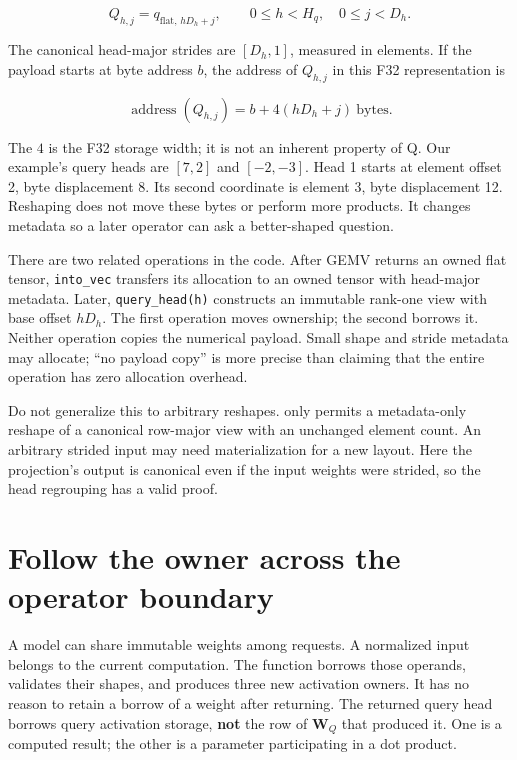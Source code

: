 \begin{equation}
Q_{h,j}=q_{\mathrm{flat},\,hD_h+j},
\qquad 0\le h<H_q,\quad 0\le j<D_h.
\end{equation}

The canonical head-major strides are \([D_h,1]\), measured in elements.
If the payload starts at byte address \(b\), the address of \(Q_{h,j}\)
in this F32 representation is

\begin{equation}
\operatorname{address}(Q_{h,j})=b+4(hD_h+j)\ \text{bytes}.
\end{equation}

The \(4\) is the F32 storage width; it is not an inherent property of Q.
Our example's query heads are \([7,2]\) and \([-2,-3]\). Head 1 starts
at element offset 2, byte displacement 8. Its second coordinate is
element 3, byte displacement 12. Reshaping does not move these bytes or
perform more products. It changes metadata so a later operator can ask a
better-shaped question.

There are two related operations in the code. After GEMV returns an
owned flat tensor, \texttt{into\_vec} transfers its allocation to an
owned tensor with head-major metadata. Later, \texttt{query\_head(h)}
constructs an immutable rank-one view with base offset \(hD_h\). The
first operation moves ownership; the second borrows it. Neither
operation copies the numerical payload. Small shape and stride metadata
may allocate; ``no payload copy'' is more precise than claiming that the
entire operation has zero allocation overhead.

Do not generalize this to arbitrary reshapes.  only permits a
metadata-only reshape of a canonical row-major view with an unchanged
element count. An arbitrary strided input may need materialization for a
new layout. Here the projection's output is canonical even if the input
weights were strided, so the head regrouping has a valid proof.

\section{Follow the owner across the operator
boundary}\label{follow-the-owner-across-the-operator-boundary}


A model can share immutable weights among requests. A normalized input
belongs to the current computation. The function borrows those operands,
validates their shapes, and produces three new activation owners. It has
no reason to retain a borrow of a weight after returning. The returned
query head borrows query activation storage, \textbf{not} the row of
\(\mathbf{W}_Q\) that produced it. One is a computed result; the other
is a parameter participating in a dot product.

